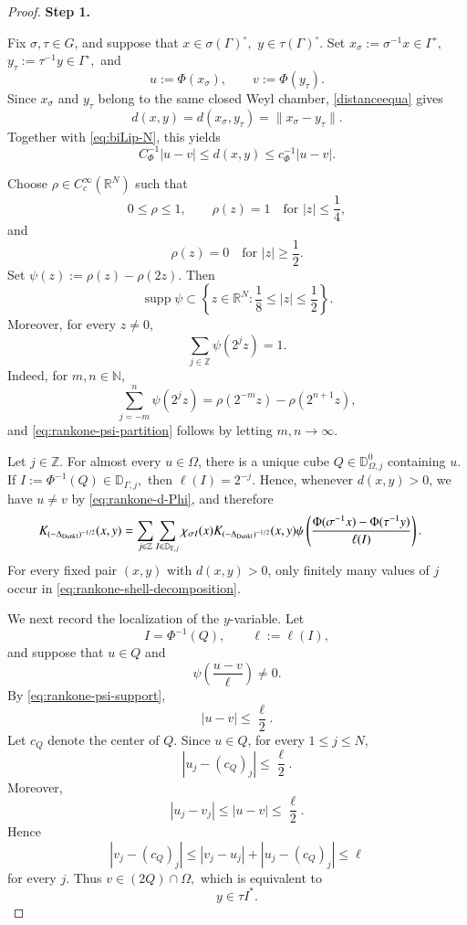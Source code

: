 \documentclass[12pt]{amsart}
\begin{document}
\begin{proof}
\medskip
\noindent
\textbf{Step 1.}

Fix $\sigma,\tau\in G$, and suppose that
$
x\in \sigma(\Gamma)^\circ,$
$
y\in \tau(\Gamma)^\circ.
$
Set
$
x_\sigma:=\sigma^{-1}x\in\Gamma^\circ,
$ $
y_\tau:=\tau^{-1}y\in\Gamma^\circ,
$
and
\[
u:=\Phi(x_\sigma),
\qquad
v:=\Phi(y_\tau).
\]
Since $x_\sigma$ and $y_\tau$ belong to the same closed Weyl chamber,
\eqref{distanceequa} gives
\[
d(x,y)
=
d(x_\sigma,y_\tau)
=
\|x_\sigma-y_\tau\|.
\]
Together with \eqref{eq:biLip-N}, this yields
\begin{equation}\label{eq:rankone-d-Phi}
C_\Phi^{-1}|u-v|
\leq
d(x,y)
\leq
c_\Phi^{-1}|u-v|.
\end{equation}

Choose $\rho\in C_c^\infty(\mathbb R^N)$ such that
\[
0\leq\rho\leq1,
\qquad
\rho(z)=1
\quad\text{for }|z|\leq\frac14,
\]
and
\[
\rho(z)=0
\quad\text{for }|z|\geq\frac12.
\]
Set
$
\psi(z):=\rho(z)-\rho(2z).
$
Then
\begin{equation}\label{eq:rankone-psi-support}
\operatorname{supp}\psi
\subset
\left\{
z\in\mathbb R^N:
\frac18\leq |z|\leq\frac12
\right\}.
\end{equation}
Moreover, for every $z\neq0$,
\begin{equation}\label{eq:rankone-psi-partition}
\sum_{j\in\mathbb Z}\psi(2^jz)=1.
\end{equation}
Indeed, for $m,n\in\mathbb N$,
\[
\sum_{j=-m}^{n}\psi(2^jz)
=
\rho(2^{-m}z)-\rho(2^{n+1}z),
\]
and \eqref{eq:rankone-psi-partition} follows by letting
$m,n\to\infty$.

Let $j\in\mathbb Z$. For almost every $u\in\Omega$, there is a unique
cube
$
Q\in\mathbb D^0_{\Omega,j}
$
containing $u$. If
$
I:=\Phi^{-1}(Q)\in\mathbb D_{\Gamma,j},
$
then $\ell(I)=2^{-j}$. Hence, whenever $d(x,y)>0$, we have
$u\neq v$ by \eqref{eq:rankone-d-Phi}, and therefore
\begin{align}
K_{(-\Delta_{{\rm Dunkl}})^{-1/2}}(x,y)
&=
\sum_{j\in\mathbb Z}
\sum_{I\in\mathbb D_{\Gamma,j}}
\chi_{\sigma I}(x)
K_{(-\Delta_{{\rm Dunkl}})^{-1/2}}(x,y)
\psi\left(
\frac{
\Phi(\sigma^{-1}x)-\Phi(\tau^{-1}y)
}{
\ell(I)
}
\right).
\label{eq:rankone-shell-decomposition}
\end{align}
For every fixed pair $(x,y)$ with $d(x,y)>0$, only finitely many
values of $j$ occur in \eqref{eq:rankone-shell-decomposition}.

We next record the localization of the $y$-variable. Let
\[
I=\Phi^{-1}(Q),
\qquad
\ell:=\ell(I),
\]
and suppose that $u\in Q$ and
\[
\psi\left(\frac{u-v}{\ell}\right)\neq0.
\]
By \eqref{eq:rankone-psi-support},
\[
|u-v|\leq\frac{\ell}{2}.
\]
Let $c_Q$ denote the center of $Q$. Since $u\in Q$, for every
$1\leq j\leq N$,
\[
|u_j-(c_Q)_j|\leq\frac{\ell}{2}.
\]
Moreover,
\[
|u_j-v_j|
\leq
|u-v|
\leq
\frac{\ell}{2}.
\]
Hence
\[
|v_j-(c_Q)_j|
\leq
|v_j-u_j|+|u_j-(c_Q)_j|
\leq\ell
\]
for every $j$. Thus
$
v\in(2Q)\cap\Omega,
$
which is equivalent to
\begin{equation}\label{eq:rankone-y-localization}
y\in\tau I^\ast.
\end{equation}


\end{proof}
\end{document}
